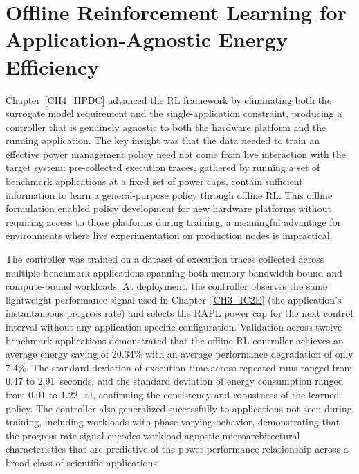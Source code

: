 \section{Offline Reinforcement Learning for Application-Agnostic Energy Efficiency}

Chapter~\ref{CH4_HPDC} advanced the RL framework by eliminating both the surrogate
model requirement and the single-application constraint, producing a controller that
is genuinely agnostic to both the hardware platform and the running application.
The key insight was that the data needed to train an effective power management policy
need not come from live interaction with the target system: pre-collected execution
traces, gathered by running a set of benchmark applications at a fixed set of power
caps, contain sufficient information to learn a general-purpose policy through offline
RL.
This offline formulation enabled policy development for new hardware platforms without
requiring access to those platforms during training, a meaningful advantage for
environments where live experimentation on production nodes is impractical.

The controller was trained on a dataset of execution traces collected across multiple
benchmark applications spanning both memory-bandwidth-bound and compute-bound
workloads.
At deployment, the controller observes the same lightweight performance signal used in
Chapter~\ref{CH3_IC2E} (the application's instantaneous progress rate) and selects
the RAPL power cap for the next control interval without any application-specific
configuration.
Validation across twelve benchmark applications demonstrated that the offline RL
controller achieves an average energy saving of 20.34\% with an average performance
degradation of only 7.4\%.
The standard deviation of execution time across repeated runs ranged from 0.47 to
2.91~seconds, and the standard deviation of energy consumption ranged from 0.01 to
1.22~kJ, confirming the consistency and robustness of the learned policy.
The controller also generalized successfully to applications not seen during training,
including workloads with phase-varying behavior, demonstrating that the progress-rate
signal encodes workload-agnostic microarchitectural characteristics that are predictive
of the power-performance relationship across a broad class of scientific applications.

